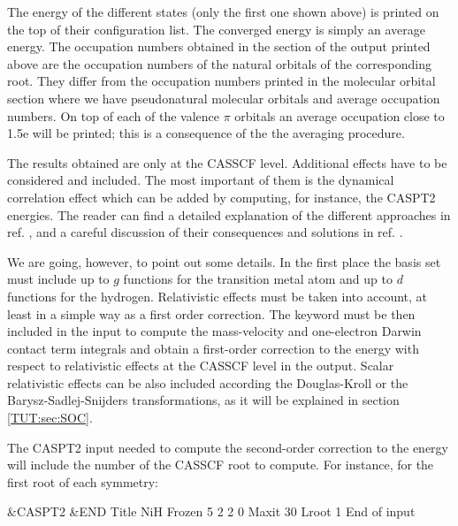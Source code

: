 The energy of the different states (only the first one shown above) is
printed on the top of their configuration list. The converged energy is
simply an average energy.   
The occupation numbers obtained in the section of the  output printed
above are the occupation numbers of the natural orbitals of the corresponding
root. They differ from the occupation numbers printed in the
molecular orbital section where we have pseudonatural molecular orbitals and
average occupation numbers. On top of each of the valence $\pi$ orbitals 
an average occupation close to 1.5e will be printed; this is a consequence
of the the averaging procedure.


The results obtained are only at the CASSCF level. Additional effects have to
be considered and included. The most important of them is the dynamical correlation
effect which can be added by computing, for instance, the CASPT2 energies. The reader can find
a detailed explanation of the different approaches in ref. \cite{Pou:94}, and a
careful discussion of their consequences and solutions in ref. \cite{Taylor:92b}.


We are going, however, to point out some details. In the first place the basis set
must include up to $g$ functions for the transition metal atom and up to $d$ 
functions for the hydrogen. Relativistic effects must be taken into account,
at least in a simple way as a first order correction. The keyword 
must be then included in the  input to compute the mass-velocity and
one-electron Darwin contact term integrals and obtain a first-order correction
to the energy with respect to relativistic effects at the CASSCF level in the  output.
Scalar relativistic effects can be also included according the Douglas-Kroll
or the Barysz-Sadlej-Snijders transformations, as it will be explained in
section \ref{TUT:sec:SOC}.

The CASPT2 input needed to compute the second-order correction to the energy
will include the number of the CASSCF root to compute. For instance, 
for the first root of each symmetry:


\begin{inputlisting}
 &CASPT2 &END                                                                   
Title                                                                           
 NiH                                                                       
Frozen
5 2 2 0
Maxit
30
Lroot
1
End of input                                                                    
\end{inputlisting}

